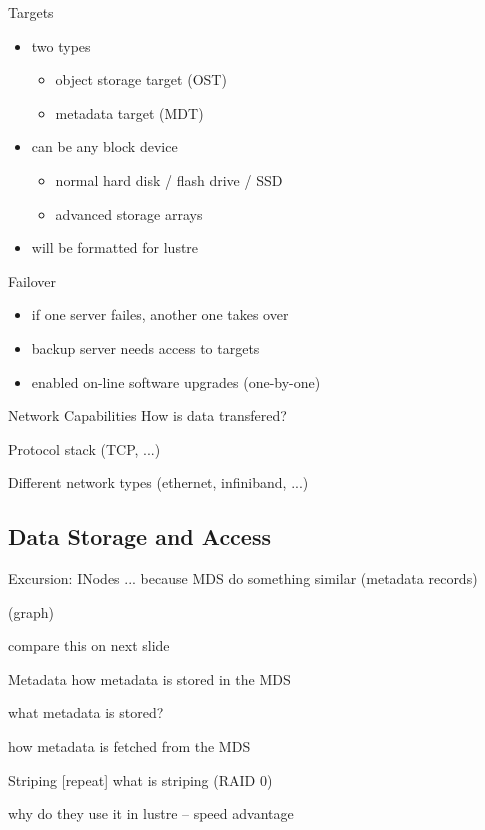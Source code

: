 \documentclass[compress,t,xcolor=dvipsnames]{beamer}
\begin{document}
\begin{frame}{Targets}
    \begin{itemize}
        \item two types
            \begin{itemize}
                \item object storage target (OST)
                \item metadata target (MDT)
            \end{itemize}
        \item can be any block device
            \begin{itemize}
                \item normal hard disk / flash drive / SSD
                \item advanced storage arrays
            \end{itemize}
        \item will be formatted for lustre
    \end{itemize}
\end{frame}

\begin{frame}{Failover}
    \begin{itemize}
        \item if one server failes, another one takes over
        \item backup server needs access to targets
        \item enabled on-line software upgrades (one-by-one)
    \end{itemize}
\end{frame}


\begin{frame}{Network Capabilities}
    How is data transfered?

    Protocol stack (TCP, ...)

    Different network types (ethernet, infiniband, ...)
\end{frame}

\subsection{Data Storage and Access}
\begin{frame}{Excursion: INodes}
    ... because MDS do something similar (metadata records)

    (graph)

    compare this on next slide
\end{frame}
\begin{frame}{Metadata}
    how metadata is stored in the MDS

    what metadata is stored?

    how metadata is fetched from the MDS
\end{frame}
\begin{frame}{Striping}
    [repeat] what is striping (RAID 0)

    why do they use it in lustre -- speed advantage
\end{frame}
\end{document}

